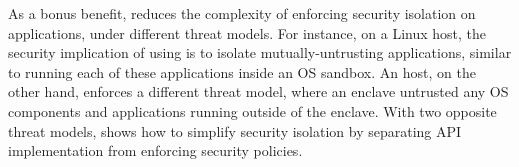 \label{sec:intro:security}






As a bonus benefit, \graphene{}
reduces the complexity of enforcing security isolation on applications,
under different threat models.
For instance, on a Linux host, the security implication of using \graphene{} is to isolate mutually-untrusting applications,
similar to running each of these applications inside an OS sandbox.
An \sgx{} host, on the other hand, enforces a different threat model,
where an enclave untrusted any OS components and applications running
outside of the enclave.
With two opposite threat models,
\graphene{} shows how to simplify security isolation
by separating API implementation from enforcing security policies.






